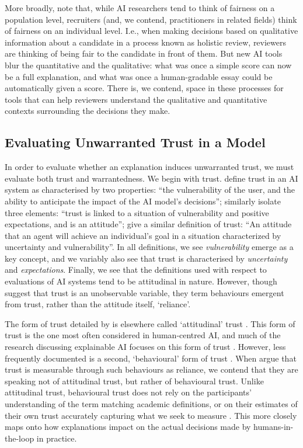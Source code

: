 More broadly, \textcite{alvero_ai_2020} note that, while AI researchers tend to think of fairness on a population level, recruiters (and, we contend, practitioners in related fields) think of fairness on an individual level. I.e., when making decisions based on qualitative information about a candidate in a process known as holistic review, reviewers are thinking of being fair to the candidate in front of them. But new AI tools blur the quantitative and the qualitative: what was once a simple score can now be a full explanation, and what was once a human-gradable essay could be automatically given a score. There is, we contend, space in these processes for tools that can help reviewers understand the qualitative and quantitative contexts surrounding the decisions they make.

\subsection{Evaluating Unwarranted Trust in a Model}
In order to evaluate whether an explanation induces unwarranted trust, we must evaluate both trust and warrantedness. We begin with trust. \textcite{jacovi_formalizing_2021} define trust in an AI system as characterised by two properties: ``the vulnerability of the user, and the ability to anticipate the impact of the AI model's decisions''; \textcite{vereschak_how_2021} similarly isolate three elements: ``trust is linked to a situation of vulnerability and positive expectations, and is an attitude''; \textcite{lee_trust_2004} give a similar definition of trust: ``An attitude that an agent will achieve an individual's goal in a situation characterized by uncertainty and vulnerability''. In all definitions, we see \emph{vulnerability} emerge as a key concept, and we variably also see that trust is characterised by \emph{uncertainty} and \emph{expectations}. Finally, we see that the definitions used with respect to evaluations of AI systems tend to be attitudinal in nature. However, though \textcite{vereschak_how_2021} suggest that trust is an unobservable variable, they term behaviours emergent from trust, rather than the attitude itself, `reliance'. 

The form of trust detailed by \textcite{vereschak_how_2021} is elsewhere called `attitudinal' trust \cite{crites_measuring_1994}. This form of trust is the one most often considered in human-centred AI, and much of the research discussing explainable AI focuses on this form of trust \cite{vereschak_how_2021, ford_play_2020, bansal_does_2021, yin_understanding_2019}. However, less frequently documented is a second, `behavioural' form of trust \cite{crites_measuring_1994}. When \textcite{jacovi_formalizing_2021,lee_trust_2004} argue that trust is measurable through such behaviours as reliance, we contend that they are speaking not of attitudinal trust, but rather of behavioural trust. Unlike attitudinal trust, behavioural trust does not rely on the participants' understanding of the term matching academic definitions, or on their estimates of their own trust accurately capturing what we seek to measure \cite{jacovi_formalizing_2021}. This more closely maps onto how explanations impact on the actual decisions made by humans-in-the-loop in practice.

